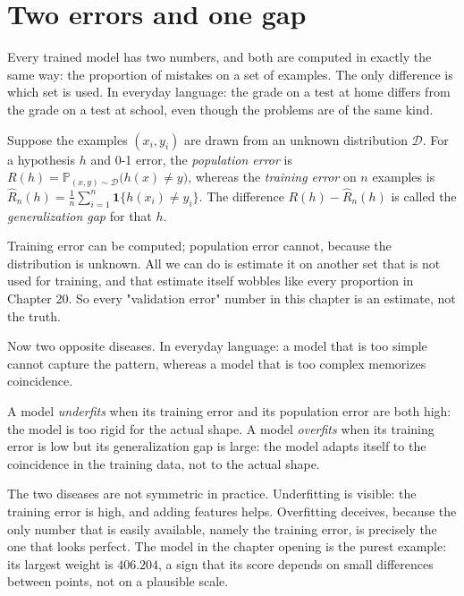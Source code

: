 \section{Two errors and one gap}

Every trained model has two numbers, and both are computed in exactly the same
way: the proportion of mistakes on a set of examples. The only difference is
which set is used. In everyday language: the grade on a test at home differs from
the grade on a test at school, even though the problems are of the same kind.


\begin{definisi}
Suppose the examples $(x_i,y_i)$ are drawn from an unknown distribution $\mathcal{D}$.
For a hypothesis $h$ and 0-1 error, the \emph{population error} is
$R(h)=\mathbb{P}_{(x,y)\sim\mathcal{D}}\bigl(h(x)\neq y\bigr)$, whereas the
\emph{training error} on $n$ examples is
$\hat R_n(h)=\frac1n\sum_{i=1}^n \mathbf{1}\{h(x_i)\neq y_i\}$.
The difference $R(h)-\hat R_n(h)$ is called the \emph{generalization gap} for that $h$.
\end{definisi}

Training error can be computed; population error cannot, because the distribution
is unknown. All we can do is estimate it on another set that is not used for
training, and that estimate itself wobbles like every proportion in Chapter 20. So
every "validation error" number in this chapter is an estimate, not the truth.

Now two opposite diseases. In everyday language: a model that is too simple cannot
capture the pattern, whereas a model that is too complex memorizes coincidence.

\begin{definisi}
A model \emph{underfits} when its training error and its population error are both
high: the model is too rigid for the actual shape. A model \emph{overfits} when its
training error is low but its generalization gap is large: the model adapts itself
to the coincidence in the training data, not to the actual shape.
\end{definisi}

The two diseases are not symmetric in practice. Underfitting is visible: the
training error is high, and adding features helps. Overfitting deceives, because
the only number that is easily available, namely the training error, is precisely
the one that looks perfect. The model in the chapter opening is the purest
example: its largest weight is $406.204$, a sign that its score depends on small
differences between points, not on a plausible scale.

